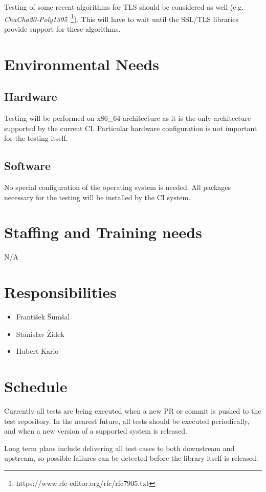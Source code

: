     Testing of some recent algorithms for TLS should be considered as well
    (e.g. \textit{ChaCha20-Poly1305}~\footnote{https://www.rfc-editor.org/rfc/rfc7905.txt}).
    This will have to wait until the SSL/TLS libraries provide support for
    these algorithms.

\section{Environmental Needs}
\subsection{Hardware}
    Testing will be performed on x86\_64 architecture as it is the only architecture
    supported by the current CI. Particular hardware configuration is not important
    for the testing itself.

\subsection{Software}
    No special configuration of the operating system is needed. All packages
    necessary for the testing will be installed by the CI system.

\section{Staffing and Training needs}
    N/A

\section{Responsibilities}
    \begin{itemize}
        \item František Šumšal
        \item Stanislav Židek
        \item Hubert Kario
    \end{itemize}

\section{Schedule}
    Currently all tests are being executed when a new PR or commit is pushed
    to the test repository. In the nearest future, all tests should be executed
    periodically, and when a new version of a supported system is released.

    Long term plans include delivering all test cases to both downstream and
    upstream, so possible failures can be detected before the library itself
    is released.

